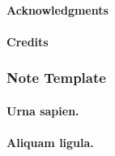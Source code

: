 


\raggedright %
\setlength{\parindent}{1em}



  \frontmatter

  \renewcommand{\hbTitle}{Placeholder Title \protect\\ That is kind of long}
  \renewcommand*{\hbCover}{assets/samples/cover}
  \hbMakecover

  \renewcommand*{\hbSubcover}{assets/samples/cover2}
  \hbMakesubcover

  \paragraph*{Acknowledgments} {\footnotesize \lipsum[100-101]}

  \paragraph*{Credits}

  {\footnotesize
  \begin{itemize}
  
  \end{itemize}}

  \clearpage
  \tableofcontents*

  \vfill\break
  \listoftables*

  \mainmatter


   \lipsum[104-105]

  \lipsum[107-110]

  \begin{hbNote}[t]
    \subsubsection*{Note Template}
    \paragraph*{Urna sapien.} \lipsum[2]
    \paragraph*{Aliquam ligula.} \lipsum[3]
  \end{hbNote}

